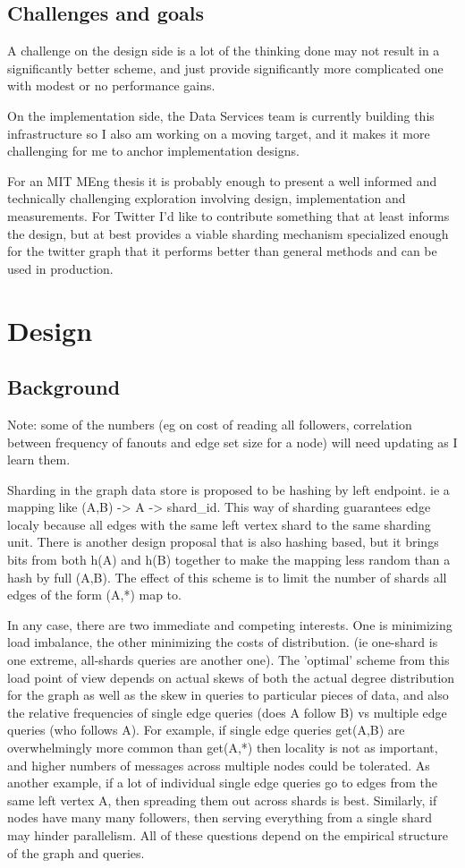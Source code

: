 \documentclass{article}
\begin{document}
\subsection{Challenges and goals}
A challenge on the design side is a lot of the thinking done may not result in a significantly better scheme, and just provide significantly more complicated one with modest or no performance gains. 

On the implementation side, the Data Services team is currently building this infrastructure so I also am working on a moving target, and it makes it more challenging for me to anchor implementation designs.

For an MIT MEng thesis it is probably enough to present a well informed and technically challenging exploration involving design, implementation and measurements. For Twitter I'd like to contribute something that at least informs the design, but at best provides a viable sharding mechanism specialized enough for the twitter graph that it performs better than general methods and can be used in production.

\section{Design}
\subsection{Background}
Note: some of the numbers (eg on cost of reading all followers, correlation between frequency of fanouts and edge set size for a node) will need updating as I learn them.

Sharding in the graph data store is proposed to be hashing by left endpoint.  ie a mapping like (A,B) -> A -> shard\_id. This way of sharding guarantees edge localy because all edges with the same left vertex shard to the same sharding unit.  There is another design proposal that is also hashing based, but it brings bits from both h(A) and h(B) together to make the mapping less random than a hash by full (A,B). The effect of this scheme is to limit the number of shards all edges of the form (A,*) map to.

In any case, there are two immediate and competing interests. One is minimizing load imbalance, the other minimizing the costs of distribution. (ie one-shard is one extreme, all-shards queries are another one). The 'optimal' scheme from this load point of view depends on actual skews of both the actual degree distribution for the graph as well as the skew in queries to particular pieces of data, and also the relative frequencies of single edge queries (does A follow B) vs multiple edge queries (who follows A).  For example, if single edge queries get(A,B) are overwhelmingly more common than get(A,*) then locality is not as important, and higher numbers of messages across multiple nodes could be tolerated.  As another example, if a lot of individual single edge queries go to edges from the same left vertex A, then spreading them out across shards is best.  Similarly, if nodes have many many followers, then serving everything from a single shard may hinder parallelism. All of these questions depend on the empirical structure of the graph and queries.
\end{document}
